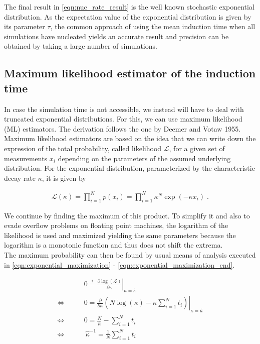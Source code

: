 The final result in \autoref{eqn:nuc_rate_result} is the well known stochastic exponential distribution. As the expectation value of the exponential distribution is given by its parameter $\tau$, the common approach of using the mean induction time when all simulations have nucleated yields an accurate result and precision can be obtained by taking a large number of simulations.

\subsection{Maximum likelihood estimator of the induction time}
\label{sec:ml_estimator}
In case the simulation time is not accessible, we instead will have to deal with truncated exponential distributions. For this, we can use maximum likelihood (ML) estimators. The derivation follows the one by Deemer and Votaw 1955\cite{Deemer1955}.\\

Maximum likelihood estimators are based on the idea that we can write down the expression of the total probability, called likelihood $\mathcal{L}$, for a given set of measurements $x_i$ depending on the parameters of the assumed underlying distribution. For the exponential distribution, parameterized by the characteristic decay rate $\kappa$, it is given by

\begin{align}
\label{eqn:exponential_product}
\mathcal{L}(\kappa) = \prod_{i=1}^N p(x_i) = \prod_{i=1}^N \kappa^N \exp\left( - \kappa x_i \right ) \; \text{.}
\end{align}

We continue by finding the maximum of this product. To simplify it and also to evade overflow problems on floating point machines, the logarithm of the likelihood is used and maximized yielding the same parameters because the logarithm is a monotonic function and thus does not shift the extrema.\\
The maximum probability can then be found by usual means of analysis executed in \autoref{eqn:exponential_maximization} - \autoref{eqn:exponential_maximization_end}.

\begin{align}
\label{eqn:exponential_maximization}
& 0 \stackrel{!}{=} \left. \frac{\partial \log (\mathcal{L})}{\partial \kappa} \right|_{\kappa=\hat{\kappa}}\\
\Leftrightarrow \qquad  &0 = \left. \frac{\partial}{\partial \kappa} \left( N \log(\kappa) - \kappa \sum_{i=1}^N t_i \right)  \right|_{\kappa=\hat{\kappa}} \\
\Leftrightarrow \qquad &0 = \frac{N}{\hat{\kappa}} - \sum_{i=1}^N t_i \\
\label{eqn:exponential_maximization_end}
\Leftrightarrow  \qquad & \!\!\!\!\!\!\!\!\: \hat{\kappa}^{-1} = \frac{1}{N} \sum_{i=1}^N t_i  
\end{align}

